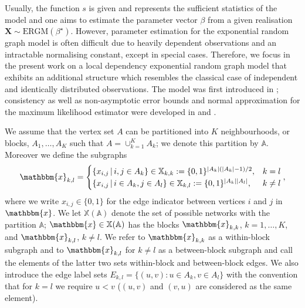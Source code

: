 \documentclass{article}
\begin{document}
Usually, the function $s$ is given and represents the sufficient statistics of the model and one aims to estimate the parameter vector $\beta$ from a given realisation $\mathbf{X} \sim \mathrm{ERGM}(\beta^{\star})$. However, parameter estimation for the exponential random graph model is often difficult due to heavily dependent observations and an intractable normalising constant, except in special cases. Therefore, we focus in the present work on a local dependency exponential random graph model that exhibits an additional structure which resembles the classical case of independent and identically distributed observations. The model was first introduced in \cite{schweinberger2015local}; consistency as well as non-asymptotic error bounds and normal approximation for the maximum likelihood estimator were developed in \cite{schweinberger2020concentration} and \cite{stewart2026rates}. \par

We assume that the vertex set $A$ can be partitioned into $K$ neighbourhoods, or blocks, $A_1, \ldots, A_K$ such that $A = \cup_{k=1}^K A_k$; we denote this partition by $\mathbb{A}$. Moreover we define the subgraphs
\begin{align*}
    \mathbbm{x}_{k,l} = 
    \begin{cases} 
    \{x_{i,j}  \, \vert \, i,j \in A_k \} \in  \mathbb{X}_{k,k}:=\{0,1\}^{{\vert A_k \vert (\vert A_k \vert -1)/}{2}},  & k=l \\
    \{x_{i,j}   \, \vert \, i \in A_k, j \in A_l \} \in  \mathbb{X}_{k,l}:=\{0,1\}^{\vert A_k \vert \vert A_l \vert},  & k\neq l
    \end{cases},
\end{align*}
where we write $x_{i,j}  \in \{0,1\}$ for the edge indicator between vertices $i$ and $j$ in $\mathbbm{x}$. We let $\mathbb{X}(\mathbb{A})$ denote the set of possible networks with the partition $\mathbb{A}$; $\mathbbm{x} \in \mathbb{X}(\mathbb{A})$  has the blocks $\mathbbm{x}_{k,k}$, $ k=1,\ldots,  K$, and $\mathbbm{x}_{k,l}$, $ k \neq l$. We  refer to $\mathbbm{x}_{k,k} $ as a within-block subgraph and to $\mathbbm{x}_{k,l}$ for $ k \neq l$ as a between-block subgraph and call the elements of the latter two sets within-block and between-block edges. We also introduce the edge label sets $E_{k,l} = \{ (u,v): u \in A_k, v \in A_l\} $ with the convention that for $k=l$ we require $u < v$ ($(u,v)$ and $(v,u)$ are considered as the same element). 
\end{document}
